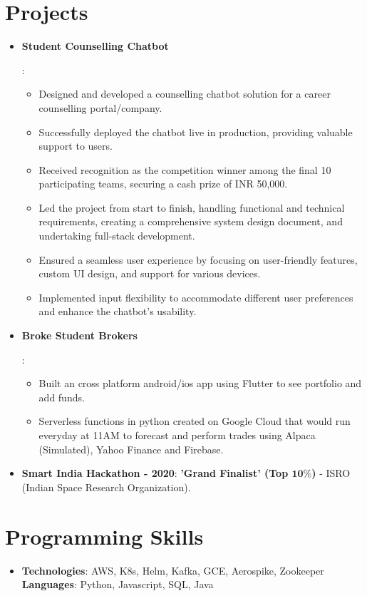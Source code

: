 \documentclass[letterpaper,11pt]{article}
\newcommand{\resumeItem}[2]{
  \item\small{
    \textbf{#1}{: #2 \vspace{-2pt}}
  }
}
\newcommand{\resumeSubHeadingListStart}{\begin{itemize}[leftmargin=*]}
\newcommand{\resumeSubHeadingListEnd}{\end{itemize}}
\begin{document}
\section{Projects}
  \resumeSubHeadingListStart
    \resumeItem{Student Counselling Chatbot}
      {
        \begin{itemize} %
          \item Designed and developed a counselling chatbot solution for a career counselling portal/company.
          \item Successfully deployed the chatbot live in production, providing valuable support to users.
          \item Received recognition as the competition winner among the final 10 participating teams, securing a cash prize of INR 50,000.
          \item Led the project from start to finish, handling functional and technical requirements, creating a comprehensive system design document, and undertaking full-stack development.
          \item Ensured a seamless user experience by focusing on user-friendly features, custom UI design, and support for various devices.
          \item Implemented input flexibility to accommodate different user preferences and enhance the chatbot's usability.
        \end{itemize}
      }
    \resumeItem{Broke Student Brokers}
      {
        \begin{itemize} %
          \item Built an cross platform android/ios app using Flutter to see portfolio and add funds.
          \item Serverless functions in python created on Google Cloud that would run everyday at 11AM to forecast and perform trades using Alpaca (Simulated), Yahoo Finance and Firebase.
        \end{itemize}
      }
    
    \resumeItem{Smart India Hackathon - 2020}
      {\textbf{'Grand Finalist' (Top $\mathbf{10\%}$)} - ISRO (Indian Space Research Organization).}

  \resumeSubHeadingListEnd

%
\section{Programming Skills}
 \resumeSubHeadingListStart
   \item{
    \textbf{Technologies}{: AWS, K8s, Helm, Kafka, GCE, Aerospike, Zookeeper}
    \hfill
    \textbf{Languages}{: Python, Javascript, SQL, Java}

   }
 \resumeSubHeadingListEnd


\end{document}
